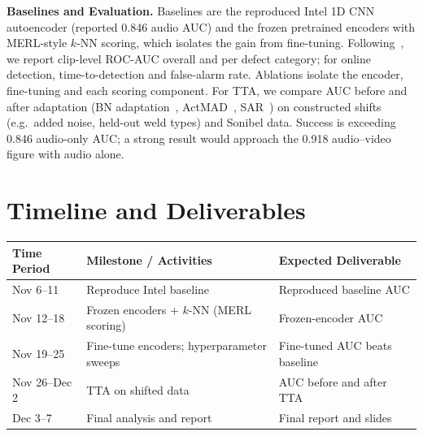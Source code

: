\documentclass[11pt]{article}
\begin{document}

{\bf Baselines and Evaluation.}
Baselines are the reproduced Intel 1D CNN autoencoder (reported 0.846 audio AUC) and the frozen pretrained encoders with MERL-style $k$-NN scoring, which isolates the gain from fine-tuning.
Following~\cite{intel}, we report clip-level ROC-AUC overall and per defect category; for online detection, time-to-detection and false-alarm rate.
Ablations isolate the encoder, fine-tuning and each scoring component. For TTA, we compare AUC before and after adaptation (BN adaptation~\cite{bnadapt}, ActMAD~\cite{actmad}, SAR~\cite{sar}) on constructed shifts (e.g.\ added noise, held-out weld types) and Sonibel data.
Success is exceeding 0.846 audio-only AUC; a strong result would approach the 0.918 audio--video figure with audio alone.

\section{Timeline and Deliverables}


\begin{center}
\begin{tabularx}{\textwidth}{p{} X X}
    \toprule
    \textbf{Time Period} &
    \textbf{Milestone / Activities} &
    \textbf{Expected Deliverable} \\
    \midrule
    Nov 6--11 & Reproduce Intel baseline & Reproduced baseline AUC \\
    Nov 12--18 & Frozen encoders + $k$-NN (MERL scoring) & Frozen-encoder AUC \\
    Nov 19--25 & Fine-tune encoders; hyperparameter sweeps & Fine-tuned AUC beats baseline \\
    Nov 26--Dec 2 & TTA on shifted data & AUC before and after TTA \\
    Dec 3--7 & Final analysis and report & Final report and slides \\
    \bottomrule
\end{tabularx}
\end{center}
\end{document}
